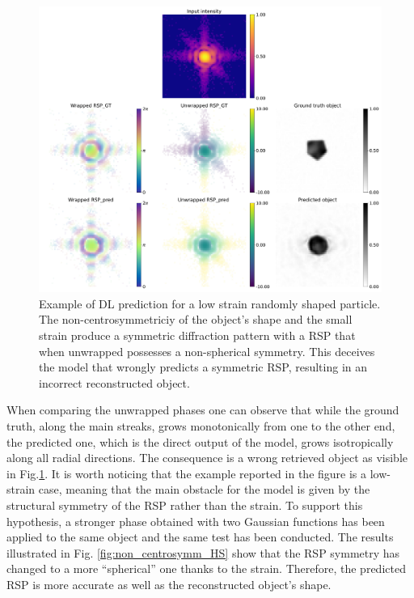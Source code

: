 \begin{figure}[H]
    \centering
    \includegraphics[width=\textwidth]{figures/Phasing/non_centrosymmetric_study_3d_random_LS0.pdf}
    \caption{Example of DL prediction for a low strain randomly shaped particle. The non-centrosymmetriciy of the object's 
    shape and the small strain produce a symmetric diffraction pattern with a RSP that when unwrapped possesses a non-spherical 
    symmetry. This deceives the model that wrongly predicts a symmetric RSP, resulting in an incorrect reconstructed object. }
    \label{fig:non_centrosymm_LS}
\end{figure}

When comparing the unwrapped phases one can observe that while the ground truth, along the main streaks, grows monotonically 
from one to the other end, the predicted one, which is the direct output of the model, grows isotropically along all radial 
directions. The consequence is a wrong retrieved object as visible in Fig.\ref{fig:non_centrosymm_LS}. 
It is worth noticing that the example reported in the figure is a low-strain case, meaning that the main obstacle for 
the model is given by the structural symmetry of the RSP rather than the strain. 
To support this hypothesis, a stronger phase obtained with two Gaussian functions has been applied to the same object and 
the same test has been conducted. The results illustrated in Fig. \ref{fig:non_centrosymm_HS} show that the RSP symmetry 
has changed to a more ``spherical'' one thanks to the strain. Therefore, the predicted RSP is more accurate as well as 
the reconstructed object's shape. 

